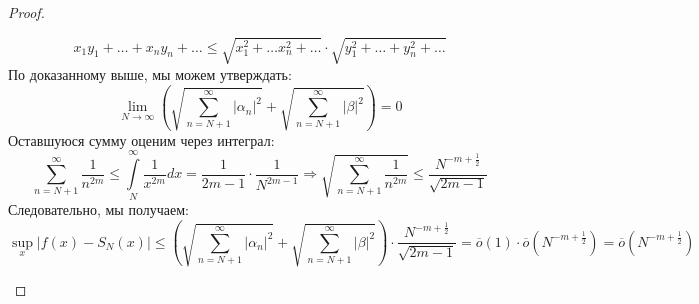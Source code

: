 \documentclass[12pt]{article}
\theoremstyle{definition}
\newcommand{\ddsum}[2]{\displaystyle\sum\limits_{#1}^{#2}}
\newcommand{\ddint}[2]{\displaystyle\int\limits_{#1}^{#2}}
\begin{document}
\begin{proof}
\begin{enumerate}[label=\arabic*)]
		$$
			x_1 y_1 + \dotsc + x_n y_n + \dotsc \leq \sqrt{x_1^2 + \dotsc x_n^2 + \dotsc}{\cdot}\sqrt{y_1^2 + \dotsc + y_n^2 + \dotsc}
		$$
		По доказанному выше, мы можем утверждать:
		$$
			\lim\limits_{N \to \infty} \left(\sqrt{\ddsum{n = N+ 1}{\infty}|\alpha_n|^2} + \sqrt{\ddsum{n = N+ 1}{\infty}|\beta|^2}\right) = 0
		$$
		Оставшуюся сумму оценим через интеграл:
		$$
			\ddsum{n = N + 1}{\infty}\dfrac{1}{n^{2m}} \leq \ddint{N}{\infty}\dfrac{1}{x^{2m}}dx = \dfrac{1}{2m - 1}{\cdot}\dfrac{1}{N^{2m -1}} \Rightarrow \sqrt{\ddsum{n = N + 1}{\infty}\dfrac{1}{n^{2m}}} \leq \dfrac{N^{-m + \tfrac{1}{2}}}{\sqrt{2m -1}}
		$$
		Следовательно, мы получаем:
		$$
			\sup\limits_{x}|f(x) - S_N(x)| \leq \left(\sqrt{\ddsum{n = N+ 1}{\infty}|\alpha_n|^2} + \sqrt{\ddsum{n = N+ 1}{\infty}|\beta|^2}\right) {\cdot}\dfrac{N^{-m + \tfrac{1}{2}}}{\sqrt{2m -1}} =\overline{o}(1){\cdot}\overline{o}\left(N^{-m + \tfrac{1}{2}}\right) = \overline{o}\left(N^{-m + \tfrac{1}{2}}\right)
		$$
	\end{enumerate}
\end{proof}
\newpage
\end{document}
